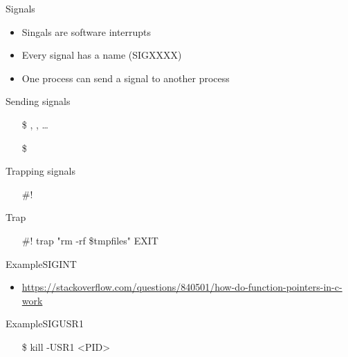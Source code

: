 \begin{frame}{Signals}
  \begin{itemize}
  \item Singals are software interrupts
  \item Every signal has a name (SIGXXXX)
  \item One process can send a signal to another process
  \end{itemize}
  \begin{block}{Sending signals}
    \begin{itemize}
    \item[\$] \Cc, \Cz, \ldots
    \item[\$] 
    \end{itemize}
  \end{block}
  \begin{block}{Trapping signals}
    \begin{itemize}
    \item[\#!] 
    \end{itemize}
  \end{block}
\end{frame}

\begin{frame}{Trap}
  \begin{center}
  \end{center}\ttfamily
  \begin{itemize}
  \item[\#!] trap "rm -rf \$tmpfiles" EXIT
  \end{itemize}
\end{frame}

\begin{frame}{Example}{SIGINT}
\begin{center}
\end{center}
\end{frame}

\begin{itemize}
\item \url{https://stackoverflow.com/questions/840501/how-do-function-pointers-in-c-work}
\end{itemize}

\begin{frame}{Example}{SIGUSR1}
  \begin{center}
  \end{center}
  \ttfamily
  \begin{itemize}
  \item[\$] kill -USR1 <PID>
  \end{itemize}
\end{frame}

